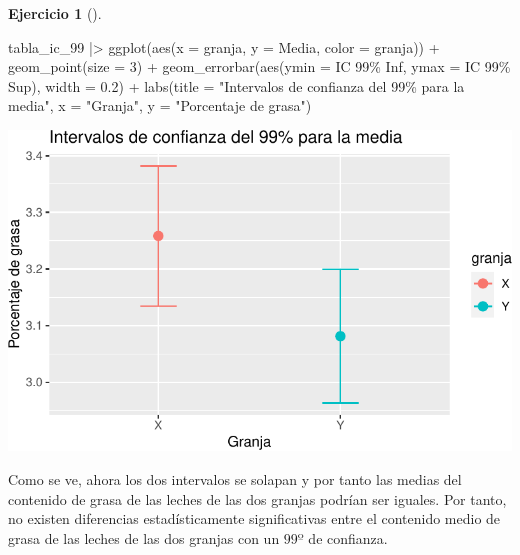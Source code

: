 \documentclass[
  a4paper,
]{scrreport}
\newenvironment{Shaded}{\begin{snugshade}}{\end{snugshade}}
\newcommand{\AttributeTok}[1]{\textcolor[rgb]{0.40,0.45,0.13}{#1}}
\newcommand{\DecValTok}[1]{\textcolor[rgb]{0.68,0.00,0.00}{#1}}
\newcommand{\FloatTok}[1]{\textcolor[rgb]{0.68,0.00,0.00}{#1}}
\newcommand{\FunctionTok}[1]{\textcolor[rgb]{0.28,0.35,0.67}{#1}}
\newcommand{\NormalTok}[1]{\textcolor[rgb]{0.00,0.23,0.31}{#1}}
\newcommand{\SpecialCharTok}[1]{\textcolor[rgb]{0.37,0.37,0.37}{#1}}
\newcommand{\StringTok}[1]{\textcolor[rgb]{0.13,0.47,0.30}{#1}}
\theoremstyle{definition}
\newtheorem{exercise}{Ejercicio}[chapter]
\theoremstyle{remark}
\begin{document}
\begin{exercise}[]
\begin{enumerate}
\begin{tcolorbox}
\begin{Shaded}
\begin{Highlighting}[]
\NormalTok{tabla\_ic\_99  }\SpecialCharTok{|\textgreater{}} 
    \FunctionTok{ggplot}\NormalTok{(}\FunctionTok{aes}\NormalTok{(}\AttributeTok{x =}\NormalTok{ granja, }\AttributeTok{y =}\NormalTok{ Media, }\AttributeTok{color =}\NormalTok{ granja)) }\SpecialCharTok{+}
    \FunctionTok{geom\_point}\NormalTok{(}\AttributeTok{size =} \DecValTok{3}\NormalTok{) }\SpecialCharTok{+}
    \FunctionTok{geom\_errorbar}\NormalTok{(}\FunctionTok{aes}\NormalTok{(}\AttributeTok{ymin =} \StringTok{\textasciigrave{}}\AttributeTok{IC 99\% Inf}\StringTok{\textasciigrave{}}\NormalTok{, }\AttributeTok{ymax =} \StringTok{\textasciigrave{}}\AttributeTok{IC 99\% Sup}\StringTok{\textasciigrave{}}\NormalTok{), }\AttributeTok{width =} \FloatTok{0.2}\NormalTok{) }\SpecialCharTok{+}
    \FunctionTok{labs}\NormalTok{(}\AttributeTok{title =} \StringTok{"Intervalos de confianza del 99\% para la media"}\NormalTok{, }\AttributeTok{x =} \StringTok{"Granja"}\NormalTok{, }\AttributeTok{y =} \StringTok{"Porcentaje de grasa"}\NormalTok{)}
\end{Highlighting}
\end{Shaded}

  \includegraphics{07-intervalos-confianza-1-poblacion_files/figure-pdf/unnamed-chunk-11-1.pdf}

  Como se ve, ahora los dos intervalos se solapan y por tanto las medias
  del contenido de grasa de las leches de las dos granjas podrían ser
  iguales. Por tanto, no existen diferencias estadísticamente
  significativas entre el contenido medio de grasa de las leches de las
  dos granjas con un \(99º%
  \) de confianza.

  \end{tcolorbox}
\end{enumerate}

\end{exercise}
\end{document}
